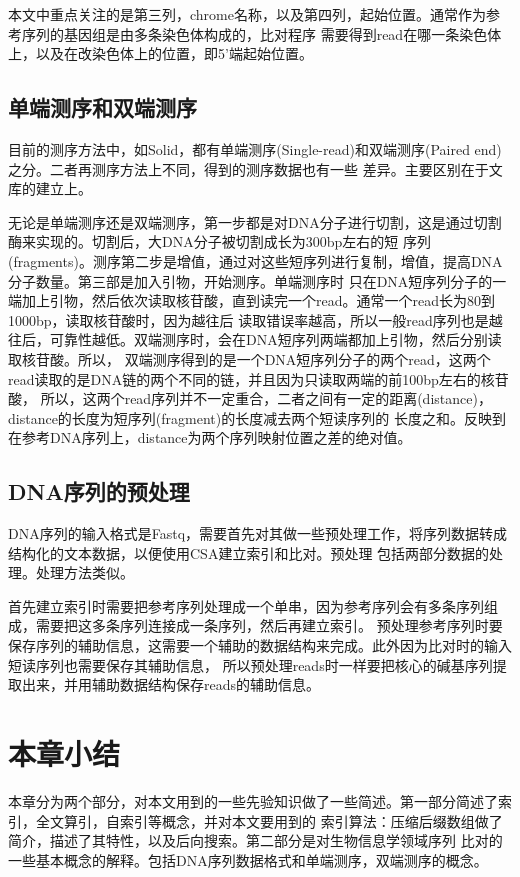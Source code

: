 本文中重点关注的是第三列，chrome名称，以及第四列，起始位置。通常作为参考序列的基因组是由多条染色体构成的，比对程序
需要得到read在哪一条染色体上，以及在改染色体上的位置，即5'端起始位置。

\subsection{单端测序和双端测序}
目前的测序方法中，如Solid，都有单端测序(Single-read)和双端测序(Paired end)之分。二者再测序方法上不同，得到的测序数据也有一些
差异。主要区别在于文库的建立上。

无论是单端测序还是双端测序，第一步都是对DNA分子进行切割，这是通过切割酶来实现的。切割后，大DNA分子被切割成长为300bp左右的短
序列(fragments)。测序第二步是增值，通过对这些短序列进行复制，增值，提高DNA分子数量。第三部是加入引物，开始测序。单端测序时
只在DNA短序列分子的一端加上引物，然后依次读取核苷酸，直到读完一个read。通常一个read长为80到1000bp，读取核苷酸时，因为越往后
读取错误率越高，所以一般read序列也是越往后，可靠性越低。双端测序时，会在DNA短序列两端都加上引物，然后分别读取核苷酸。所以，
双端测序得到的是一个DNA短序列分子的两个read，这两个read读取的是DNA链的两个不同的链，并且因为只读取两端的前100bp左右的核苷酸，
所以，这两个read序列并不一定重合，二者之间有一定的距离(distance)，distance的长度为短序列(fragment)的长度减去两个短读序列的
长度之和。反映到在参考DNA序列上，distance为两个序列映射位置之差的绝对值。

\subsection{DNA序列的预处理}
DNA序列的输入格式是Fastq，需要首先对其做一些预处理工作，将序列数据转成结构化的文本数据，以便使用CSA建立索引和比对。预处理
包括两部分数据的处理。处理方法类似。

首先建立索引时需要把参考序列处理成一个单串，因为参考序列会有多条序列组成，需要把这多条序列连接成一条序列，然后再建立索引。
预处理参考序列时要保存序列的辅助信息，这需要一个辅助的数据结构来完成。此外因为比对时的输入短读序列也需要保存其辅助信息，
所以预处理reads时一样要把核心的碱基序列提取出来，并用辅助数据结构保存reads的辅助信息。

\section{本章小结}
本章分为两个部分，对本文用到的一些先验知识做了一些简述。第一部分简述了索引，全文算引，自索引等概念，并对本文要用到的
索引算法：压缩后缀数组做了简介，描述了其特性，以及后向搜索。第二部分是对生物信息学领域序列
比对的一些基本概念的解释。包括DNA序列数据格式和单端测序，双端测序的概念。

